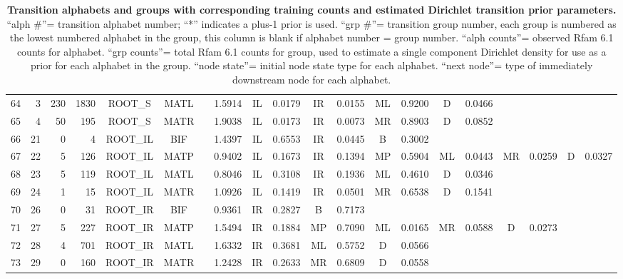 \documentclass[11pt]{article}
\renewcommand{\baselinestretch}{1.5}
\renewcommand{\baselinestretch}{1.5}
\begin{document}
\begin{table}
\begin{center}
\begin{tabular}{|rr|rr|cc|c|c|cc|cc|cc|cc|cc|cc|}
64  & 3  & 230   & 1830  & ROOT\_S  & MATL & & 1.5914  & IL & 0.0179 & IR & 0.0155 & ML & 0.9200 & D  & 0.0466 &    &  &  &  \\  
65  & 4  & 50    & 195   & ROOT\_S  & MATR & & 1.9038  & IL & 0.0173 & IR & 0.0073 & MR & 0.8903 & D  & 0.0852 &    &  &  &  \\  
66  & 21 & 0     & 4     & ROOT\_IL & BIF  & & 1.4397  & IL & 0.6553 & IR & 0.0445 & B  & 0.3002 &    &        &    &  &  &  \\  
67  & 22 & 5     & 126   & ROOT\_IL & MATP & & 0.9402  & IL & 0.1673 & IR & 0.1394 & MP & 0.5904 & ML & 0.0443 & MR & 0.0259 & D & 0.0327 \\  
68  & 23 & 5     & 119   & ROOT\_IL & MATL & & 0.8046  & IL & 0.3108 & IR & 0.1936 & ML & 0.4610 & D  & 0.0346 &    &  &  &  \\  
69  & 24 & 1     & 15    & ROOT\_IL & MATR & & 1.0926  & IL & 0.1419 & IR & 0.0501 & MR & 0.6538 & D  & 0.1541 &    &  &  &  \\  
70  & 26 & 0     & 31    & ROOT\_IR & BIF  & & 0.9361  & IR & 0.2827 & B  & 0.7173 &    &        &    &        &    &  &  &  \\  
71  & 27 & 5     & 227   & ROOT\_IR & MATP & & 1.5494  & IR & 0.1884 & MP & 0.7090 & ML & 0.0165 & MR & 0.0588 & D  & 0.0273 &  &  \\  
72  & 28 & 4     & 701   & ROOT\_IR & MATL & & 1.6332  & IR & 0.3681 & ML & 0.5752 & D  & 0.0566 &    &        &    &  &  &  \\  
73  & 29 & 0     & 160   & ROOT\_IR & MATR & & 1.2428  & IR & 0.2633 & MR & 0.6809 & D  & 0.0558 &    &        &    &  &  &  \\   \cline{1-6} \cline {8-20} 
\end{tabular}
\end{center}

\normalfont\rmfamily
\caption{\textbf{Transition alphabets and groups with corresponding
    training counts and estimated Dirichlet transition prior parameters.}
  ``alph \#''= transition alphabet number; ``*'' indicates a plus-1
  prior is used. ``grp \#''= transition
  group number, each group is numbered as the lowest numbered alphabet in
  the group, this column is blank if alphabet number = group
  number. ``alph counts''= observed Rfam 6.1 counts for
  alphabet. ``grp counts''= total Rfam 6.1 counts for group, used
  to estimate a single component Dirichlet density for use as a prior
  for each alphabet in the group. ``node state''= initial node state
  type for each alphabet. ``next node''= type of immediately downstream
  node for each alphabet.}
\label{tbl:transitions}
\end{table}
\renewcommand{\baselinestretch}{1.5}
\fi
\end{document}
